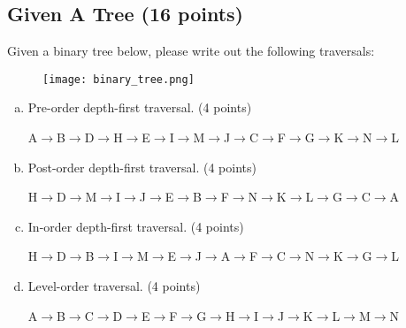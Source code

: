 \documentclass[11pt]{exam}
\begin{document}
\subsection{Given A Tree (16 points)}
Given a binary tree below, please write out the following traversals:
\begin{figure}[H]
    \centering
    \texttt{[image: binary\_tree.png]}
\end{figure}
\begin{enumerate}[(a)]
    \item Pre-order depth-first traversal. (4 points)
          \begin{solution}
              A$\to$B$\to$D$\to$H$\to$E$\to$I$\to$M$\to$J$\to$C$\to$F$\to$G$\to$K$\to$N$\to$L
          \end{solution}

    \item Post-order depth-first traversal. (4 points)
          \begin{solution}
              H$\to$D$\to$M$\to$I$\to$J$\to$E$\to$B$\to$F$\to$N$\to$K$\to$L$\to$G$\to$C$\to$A
          \end{solution}

    \item In-order depth-first traversal. (4 points)
          \begin{solution}
              H$\to$D$\to$B$\to$I$\to$M$\to$E$\to$J$\to$A$\to$F$\to$C$\to$N$\to$K$\to$G$\to$L
          \end{solution}

    \item Level-order traversal. (4 points)
          \begin{solution}
              A$\to$B$\to$C$\to$D$\to$E$\to$F$\to$G$\to$H$\to$I$\to$J$\to$K$\to$L$\to$M$\to$N
          \end{solution}

\end{enumerate}
\end{document}
